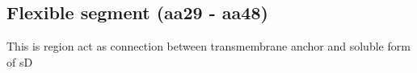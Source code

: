 \subsection{Flexible segment (aa29 - aa48)}

This is region act as connection between transmembrane anchor and soluble form of sD
